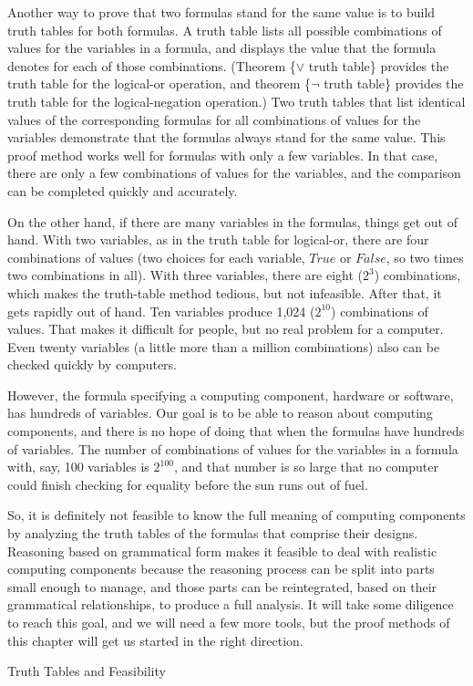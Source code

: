 \begin{aside}
Another way to prove that two formulas stand
for the same value is to build truth tables for both formulas.
A truth table lists all possible combinations of values for the
variables in a formula, and displays the value that the formula
denotes for each of those combinations. (Theorem \{$\vee$ truth table\} provides
the truth table for the logical-or operation, and theorem \{$\neg$ truth table\}
provides the truth table for the logical-negation operation.)
Two truth tables that list identical values of the corresponding
formulas for all combinations of values for
the variables demonstrate that the formulas always stand for the
same value. This proof method works well for formulas with only
a few variables. In that case, there are only a few combinations
of values for the variables, and the comparison can be completed quickly and accurately.

On the other hand, if there are many variables in the formulas,
things get out of hand. With two variables, as in the truth table
for logical-or, there are four combinations of values
(two choices for each variable, $True$ or $False$, so two times two
combinations in all). With three variables, there are eight
($2^3$) combinations, which makes the truth-table method tedious,
but not infeasible. After that, it gets rapidly out of hand.
Ten variables produce 1,024 ($2^{10}$) combinations of values.
That makes it difficult for people, but no real problem for a computer.
Even twenty variables (a little more than a million combinations)
also can be checked quickly by computers.

However, the formula specifying a computing component,
hardware or software, has hundreds of variables.
Our goal is to be able to reason about
computing components, and there is no hope of doing
that when the formulas have hundreds of variables. The number of combinations
of values for the variables in a formula with, say,
100 variables is $2^{100}$, and that number is so large that no computer could
finish checking for equality before the sun runs out of fuel.

So, it is definitely not feasible to know the full meaning
of computing components by analyzing the truth tables of the
formulas that comprise their designs. Reasoning based on grammatical form
makes it feasible to deal with realistic computing components
because the reasoning process can be split into parts small enough
to manage, and those parts can be reintegrated, based on
their grammatical relationships, to produce a full analysis.
It will take some diligence to reach this goal, and
we will need a few more tools, but the proof methods
of this chapter will get us started in the right direction.
\caption{Truth Tables and Feasibility}
\label{feasibility}
\end{aside}


